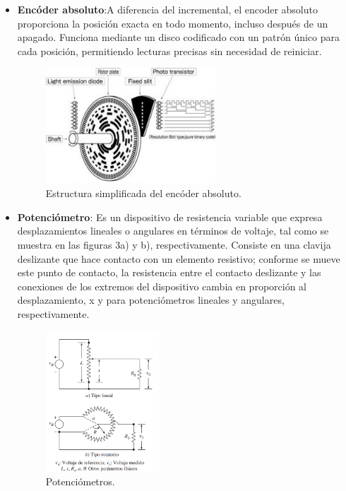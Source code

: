 \begin{itemize}
	
	\item \textbf{Encóder absoluto}:A diferencia del incremental, el encoder absoluto proporciona la posición exacta en todo momento, incluso después de un apagado. Funciona mediante un disco codificado con un patrón único para cada posición, permitiendo lecturas precisas sin necesidad de reiniciar.
	\begin{figure}[h]
		\centering
		\includegraphics[width=0.6\textwidth]{img/encoderabsoluto.jpg}
		\caption{Estructura simplificada del encóder absoluto.}
		\label{fig:encoderabsoluto}
	\end{figure}
	
	
	\item \textbf{Potenciómetro}: Es un dispositivo de resistencia variable que expresa desplazamientos lineales o angulares en términos de voltaje, tal como se muestra en las figuras 3a) y b), respectivamente. Consiste en una clavija deslizante que hace contacto con un elemento resistivo; conforme se mueve este punto de contacto, la resistencia entre el contacto deslizante y las conexiones de los extremos del dispositivo cambia en proporción al desplazamiento, x y  para potenciómetros lineales y angulares, respectivamente.
	\begin{figure}[h]
		\centering
		\includegraphics[width=0.4\textwidth]{img/potenciometro.png}
		\caption{Potenciómetros.}
		\label{fig:potenciometros}
	\end{figure}
	

\end{itemize}
